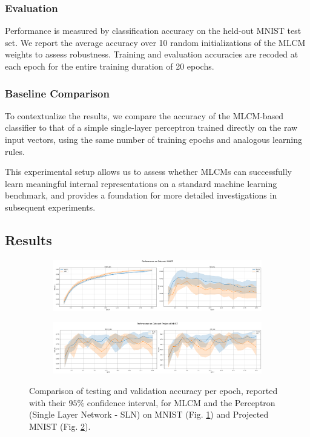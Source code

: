 \documentclass[a4paper,12pt]{report}
\begin{document}
\subsubsection*{Evaluation}
Performance is measured by classification accuracy on the held-out MNIST test set. 
We report the average accuracy over 10 random initializations of the MLCM weights to 
assess robustness. Training and evaluation accuracies are recoded at each epoch 
for the entire training duration of 20 epochs.
%
\subsubsection*{Baseline Comparison}
To contextualize the results, we compare the accuracy of the MLCM-based classifier 
to that of a simple single-layer perceptron trained directly on the raw input vectors, 
using the same number of training epochs and analogous learning rules.

This experimental setup allows us to assess whether MLCMs can successfully learn 
meaningful internal representations on a standard machine learning benchmark, and 
provides a foundation for more detailed investigations in subsequent experiments.
\subsection{Results}
\newcommand{\experimentlength}{1}
\begin{figure}[h!]
    \centering
    \begin{subfigure}{\experimentlength\textwidth}
        \includegraphics[width=\linewidth]{pictures/mnist_exp1.png}
        \caption{}\label{fig:mnist_exp1}
    \end{subfigure}
    \hfill
    \begin{subfigure}{\experimentlength\textwidth}
        \includegraphics[width=\linewidth]{pictures/projected_mnist_exp1.png}
        \caption{}\label{fig:emnist_exp1}
    \end{subfigure}
    \caption{Comparison of testing and validation accuracy per epoch, reported with 
    their $95\%$ confidence interval, for MLCM and the Perceptron (Single Layer 
    Network  - SLN) on MNIST (Fig. \ref{fig:mnist_exp1}) and Projected MNIST 
    (Fig. \ref{fig:emnist_exp1}).}
    \label{fig:all_mnist_exp1}
\end{figure}
\end{document}
